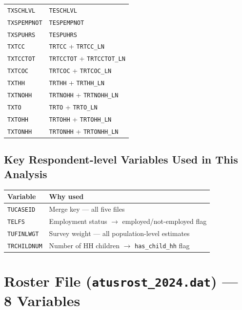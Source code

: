 \documentclass[11pt, a4paper]{article}
\begin{document}
\begin{longtable}{L{3.5cm} L{12cm}}
\texttt{TXSCHLVL}   & \texttt{TESCHLVL} \\
 \texttt{TXSPEMPNOT} & \texttt{TESPEMPNOT} \\
\texttt{TXSPUHRS}   & \texttt{TESPUHRS} \\
 \texttt{TXTCC}      & \texttt{TRTCC} + \texttt{TRTCC\_LN} \\
\texttt{TXTCCTOT}   & \texttt{TRTCCTOT} + \texttt{TRTCCTOT\_LN} \\
 \texttt{TXTCOC}     & \texttt{TRTCOC} + \texttt{TRTCOC\_LN} \\
\texttt{TXTHH}      & \texttt{TRTHH} + \texttt{TRTHH\_LN} \\
 \texttt{TXTNOHH}    & \texttt{TRTNOHH} + \texttt{TRTNOHH\_LN} \\
\texttt{TXTO}       & \texttt{TRTO} + \texttt{TRTO\_LN} \\
 \texttt{TXTOHH}     & \texttt{TRTOHH} + \texttt{TRTOHH\_LN} \\
\texttt{TXTONHH}    & \texttt{TRTONHH} + \texttt{TRTONHH\_LN} \\
\end{longtable}

\subsection*{Key Respondent-level Variables Used in This Analysis}
\begin{longtable}{L{3.8cm} L{12cm}}
\toprule \textbf{Variable} & \textbf{Why used} \\ \midrule \endhead
\bottomrule \endfoot
\texttt{TUCASEID}    & Merge key --- all five files \\
 \texttt{TELFS}       & Employment status $\to$ employed/not-employed flag \\
\texttt{TUFINLWGT}   & Survey weight --- all population-level estimates \\
 \texttt{TRCHILDNUM}  & Number of HH children $\to$ \texttt{has\_child\_hh} flag \\
\end{longtable}

\newpage
\section{Roster File (\texttt{atusrost\_2024.dat}) --- 8 Variables}
\end{document}
